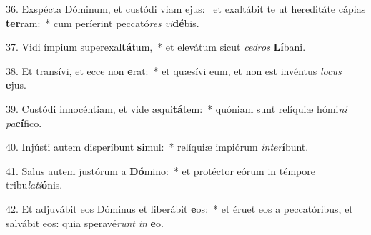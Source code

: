 36. Exspécta Dóminum, et custódi viam ejus: \dag\  et exaltábit te ut hereditáte cápias \textbf{ter}ram:~*  cum períerint peccató\textit{res} \textit{vi}\textbf{dé}bis.\

37. Vidi ímpium superexal\textbf{tá}tum,~*  et elevátum sicut \textit{ce}\textit{dros} \textbf{Lí}bani.\

38. Et transívi, et ecce non \textbf{e}rat:~*  et quæsívi eum, et non est invéntus \textit{lo}\textit{cus} \textbf{e}jus.\

39. Custódi innocéntiam, et vide æqui\textbf{tá}tem:~*  quóniam sunt relíquiæ hómi\textit{ni} \textit{pa}\textbf{cí}fico.\

40. Injústi autem disperíbunt \textbf{si}mul:~*  relíquiæ impiórum \textit{in}\textit{ter}\textbf{í}bunt.\

41. Salus autem justórum a \textbf{Dó}mino:~*  et protéctor eórum in témpore tribu\textit{la}\textit{ti}\textbf{ó}nis.\

42. Et adjuvábit eos Dóminus et liberábit \textbf{e}os:~*  et éruet eos a peccatóribus, et salvábit eos: quia speravé\textit{runt} \textit{in} \textbf{e}o.\

